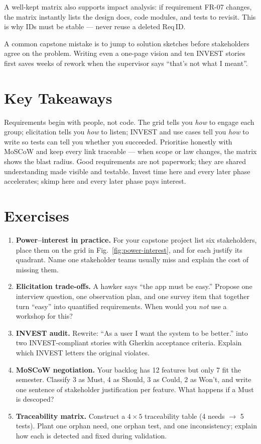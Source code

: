 A well-kept matrix also supports impact analysis: if requirement FR-07 changes, the matrix instantly lists the design docs, code modules, and tests to revisit. This is why IDs must be stable --- never reuse a deleted Req\,ID.

A common capstone mistake is to jump to solution sketches before stakeholders agree on the problem. Writing even a one-page vision and ten INVEST stories first saves weeks of rework when the supervisor says ``that's not what I meant''.

\section{Key Takeaways}
Requirements begin with people, not code. The grid tells you \emph{how} to engage each group; elicitation tells you \emph{how} to listen; INVEST and use cases tell you \emph{how} to write so tests can tell you whether you succeeded. Prioritise honestly with MoSCoW and keep every link traceable --- when scope or law changes, the matrix shows the blast radius.
Good requirements are not paperwork; they are shared understanding made visible and testable. Invest time here and every later phase accelerates; skimp here and every later phase pays interest.

\section{Exercises}
\label{sec:ch02-exercises}
\begin{enumerate}[label=E2.\arabic*, leftmargin=*, itemsep=0.55em]
    \item \textbf{Power--interest in practice.} For your capstone project list six stakeholders, place them on the grid in Fig.~\ref{fig:power-interest}, and for each justify its quadrant. Name one stakeholder teams usually miss and explain the cost of missing them.
    \item \textbf{Elicitation trade-offs.} A hawker says ``the app must be easy.'' Propose one interview question, one observation plan, and one survey item that together turn ``easy'' into quantified requirements. When would you \emph{not} use a workshop for this?
    \item \textbf{INVEST audit.} Rewrite: ``As a user I want the system to be better.'' into two INVEST-compliant stories with Gherkin acceptance criteria. Explain which INVEST letters the original violates.
    \item \textbf{MoSCoW negotiation.} Your backlog has 12 features but only 7 fit the semester. Classify 3 as Must, 4 as Should, 3 as Could, 2 as Won't, and write one sentence of stakeholder justification per feature. What happens if a Must is descoped?
    \item \textbf{Traceability matrix.} Construct a $4\times5$ traceability table (4 needs $\to$ 5 tests). Plant one orphan need, one orphan test, and one inconsistency; explain how each is detected and fixed during validation.
\end{enumerate}
